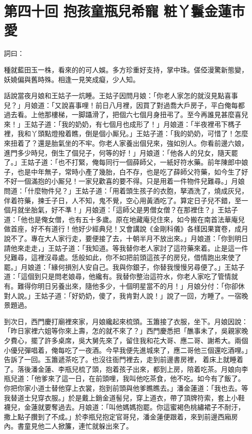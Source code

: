 
\chapter*{第四十回 抱孩童瓶兒希寵 粧丫鬟金蓮市愛}


詞曰：

\begin{myquote}
種就藍田玉一株，看來的的可人娛。多方珍重好支持，掌中珠。傞俹漫驚新態變，妖嬈偏與舊時殊。相逢一見笑成癡，少人知。

\end{myquote}

話說當夜月娘和王姑子一炕睡。王姑子因問月娘：「你老人家怎的就沒見點喜事兒？」月娘道：「又說喜事哩！前日八月裡，因買了對過喬大戶房子，平白俺每都過去看。上他那樓梯，一脚躡滑了，把個六七個月身扭弔了。至今再誰見甚麼喜兒來！」王姑子道：「我的奶奶，有七個月也成形了！」月娘道：「半夜裡弔下榪子裡，我和丫頭點燈撥着瞧，倒是個小厮兒。」王姑子道：「我的奶奶，可惜了！怎麼來扭着了？還是胎氣坐的不牢。{}你老人家養出個兒來，強如別人。你看前邊六娘，進門多少時兒，倒生了個兒子，何等的好！」月娘道：「他各人的兒女，隨天罷了。」王姑子道：「也不打緊，俺每同行一個薛師父，一紙好符水藥。前年陳郎中娘子，也是中年無子，常時小產了幾胎，白不存，也是吃了薛師父符藥，如今生了好不好一個滿抱的小厮兒！一家兒歡喜的要不得。只是用着一件物件兒難尋。」月娘問道：「什麼物件兒？」王姑子道：「用着頭生孩子的衣胞，拏酒洗了，燒成灰兒，伴着符藥，揀壬子日，人不知，鬼不覺，空心用黃酒吃了。算定日子兒不錯，至一個月就坐胎氣，好不準！」月娘道：「這師父是男僧女僧？在那裡住？」王姑子道：「他也是俺女僧，也有五十多歲。原在地藏庵兒住來，如今搬在南首法華庵兒做首座，好不有道行！他好少經典兒！又會講說《金剛科儀》各樣因果寶卷，成月說不了。專在大人家行走，要便接了去，十朝半月不放出來。」月娘道：「你到明日請他來走走，」王姑子道：「我知道。等我替你老人家討了這符藥來着。止是這一件兒難尋，這裡沒尋處。恁般如此，你不如把前頭這孩子的房兒，借情跑出來使了罷。」月娘道：「緣何損別人安自己。我與你銀子，你替我慢慢另尋便了。」王姑子道：「這個到只是問老娘尋，他纔有。我替你整治這符水，你老人家吃了管情就有。難得你明日另養出來，隨他多少，十個明星當不的月！」月娘分付：「你卻休對人說。」王姑子道：「好奶奶，傻了，我肯對人說！」說了一回，方睡了。一宿晚景題過。

到次日，西門慶打廟裡來家，月娘纔起來梳頭。玉簫接了衣服，坐下。月娘因說：「昨日家裡六姐等你來上壽，怎的就不來了？」西門慶悉把「醮事未了，吳親家晚夕費心，擺了許多桌席，吳大舅先來了，留住我和花大哥、應二哥、謝希大。兩個小優兒彈唱着，俺每吃了一夜酒。今早我便先進城來了，應二哥他三個還吃酒哩。」告訴了一回。玉簫遞茶吃了。也沒往衙門裡去，走到前邊書房裡，𢱉着床上就睡着了。落後潘金蓮、李瓶兒梳了頭，抱着孩子出來，都到上房，陪着吃茶。月娘向李瓶兒道：「他爹來了這一日，在前頭哩，我叫他吃茶食，他不吃。如今有了飯了。你把你家小道士替他穿上衣裳，抱到前頭與他爹瞧瞧去。」潘金蓮道：「我也去。等我替道士兒穿衣服。」{}於是戴上銷金道髻兒，穿上道衣，帶了頂牌符索，套上小鞋襪兒，金蓮就要奪過去。月娘道：「叫他媽媽抱罷。你這蜜褐色桃繡裙子不耐汙，撒上點子臢到了不成。」於李瓶兒抱定官哥兒，潘金蓮便跟着，來到前邊西廂房內。書童見他二人掀簾，連忙就躲出來了。

